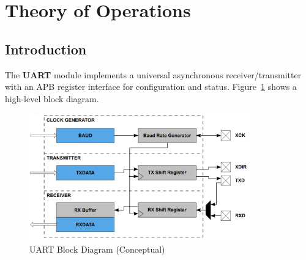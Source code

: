 \section{Theory of Operations}

\subsection{Introduction}
The \textbf{UART} module implements a universal asynchronous receiver/transmitter with an APB register interface for configuration and status. Figure~\ref{fig:uart_blockdiagram} shows a high-level block diagram.

\begin{figure}[H]
  \centering
  \includegraphics[width=0.85\textwidth]{images/uart_block_diagram.png}
  \caption{UART Block Diagram (Conceptual)}
  \label{fig:uart_blockdiagram}
\end{figure}

